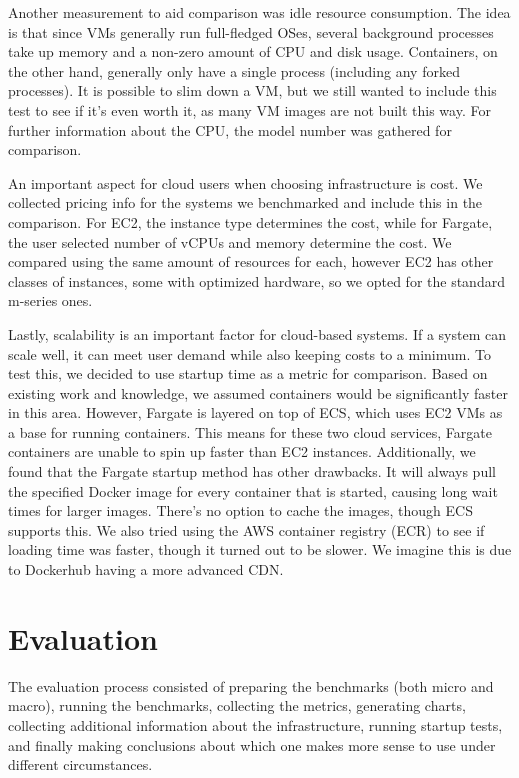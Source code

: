 \documentclass[11pt]{article}
\begin{document}
Another measurement to aid comparison was idle resource consumption. The idea is that since VMs generally run full-fledged OSes, several background processes take up memory and a non-zero amount of CPU and disk usage. Containers, on the other hand, generally only have a single process (including any forked processes). It is possible to slim down a VM, but we still wanted to include this test to see if it's even worth it, as many VM images are not built this way. For further information about the CPU, the model number was gathered for comparison.

An important aspect for cloud users when choosing infrastructure is cost. We collected pricing info for the systems we benchmarked and include this in the comparison. For EC2, the instance type determines the cost, while for Fargate, the user selected number of vCPUs and memory determine the cost. We compared using the same amount of resources for each, however EC2 has other classes of instances, some with optimized hardware, so we opted for the standard m-series ones.

Lastly, scalability is an important factor for cloud-based systems. If a system can scale well, it can meet user demand while also keeping costs to a minimum. To test this, we decided to use startup time as a metric for comparison. Based on existing work and knowledge, we assumed containers would be significantly faster in this area. However, Fargate is layered on top of ECS, which uses EC2 VMs as a base for running containers. This means for these two cloud services, Fargate containers are unable to spin up faster than EC2 instances. Additionally, we found that the Fargate startup method has other drawbacks. It will always pull the specified Docker image for every container that is started, causing long wait times for larger images. There's no option to cache the images, though ECS supports this. We also tried using the AWS container registry (ECR) to see if loading time was faster, though it turned out to be slower. We imagine this is due to Dockerhub having a more advanced CDN.

\vspace{3mm} %


\section{Evaluation}

The evaluation process consisted of preparing the benchmarks (both micro and macro), running the benchmarks, collecting the metrics, generating charts, collecting additional information about the infrastructure, running startup tests, and finally making conclusions about which one makes more sense to use under different circumstances.
\end{document}
